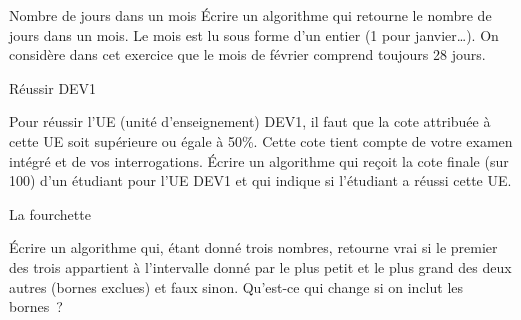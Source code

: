 		\begin{Exercice}{Nombre de jours dans un mois}
			Écrire un algorithme qui retourne le nombre de jours dans un mois. 
			Le mois est lu sous forme d’un entier (1 pour janvier\dots).
			On considère dans cet exercice que le mois de février
			comprend toujours 28 jours.
		\end{Exercice}

		\begin{Exercice}{Réussir DEV1}

			Pour réussir l’UE (unité d’enseignement) DEV1,
			il faut que la cote attribuée à cette UE 
			soit supérieure ou égale à 50\%.
			Cette cote tient compte de votre examen intégré
			et de vos interrogations.
			Écrire un algorithme 
			qui reçoit la cote finale (sur 100)
			d’un étudiant pour l’UE DEV1
			et qui indique si l’étudiant a réussi cette UE.
		\end{Exercice}	

		\begin{comment}
		\begin{Exercice}{Réussir GEN1}

			\label{algo:réussirGEN1}
			l'UE (Unité d'enseignement) GEN1 est composée de trois AA (activité d’apprentissage) :
			Mathématique, Communication anglophone et Comptabilité%
			\footnote{%
				Sans parler de Méthodologie qui ne donne pas lieu à une évaluation.
			}.
			Pour réussir cette unité d’enseignement,
			il faut que la cote attribuée à chaque AA soit supérieure ou égale à 50\%.
			Si c'est le cas, la cote attribuée à l'UE est une moyenne \textbf{pondérée}
			des trois cotes d'AA 
			(avec la pondération 6 pour Mathématique et 2 pour les autres AA).

			Écrire un algorithme qui reçoit les 3 cotes (sur 20) d’AA d’un étudiant
			pour l’UE GEN1 et qui \textbf{affiche} un message
			indiquant si l’étudiant a réussi ou pas cette UE.
			S’il a réussi, l’algorithme affiche également la cote d'UE (sur 20).
		\end{Exercice}		
		\end{comment}

		\begin{Exercice}{La fourchette}

			Écrire un algorithme qui, étant donné trois nombres, 
			retourne vrai si le premier des trois 
			appartient à l’intervalle donné par le plus petit et le plus grand 
			des deux autres (bornes exclues) et faux sinon. 
			Qu’est-ce qui change si on inclut les bornes~?
		\end{Exercice}

